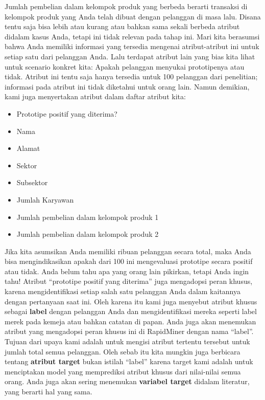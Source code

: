 \par Jumlah pembelian dalam kelompok produk yang berbeda berarti transaksi di kelompok produk yang Anda telah dibuat dengan pelanggan di masa lalu. Disana tentu saja bisa lebih atau kurang atau bahkan sama sekali berbeda atribut didalam kasus Anda, tetapi ini tidak relevan pada tahap ini. Mari kita berasumsi bahwa Anda memiliki informasi yang tersedia mengenai atribut-atribut ini untuk setiap satu dari pelanggan Anda. Lalu terdapat atribut lain yang bias kita lihat untuk scenario konkret kita: Apakah pelanggan menyukai prototipenya atau tidak. Atribut ini tentu saja hanya tersedia untuk 100 pelanggan dari penelitian; informasi pada atribut ini tidak diketahui untuk orang lain. Namun demikian, kami juga menyertakan atribut dalam daftar atribut kita:

\begin{itemize}
    \item 	Prototipe positif yang diterima?
 \item	Nama 
 \item	Alamat 
 \item	Sektor 
 \item	Subsektor 
 \item	Jumlah Karyawan 
 \item	Jumlah pembelian dalam kelompok produk 1 
 \item	Jumlah pembelian dalam kelompok produk 2

\end{itemize}

\par Jika kita asumsikan Anda memiliki ribuan pelanggan secara total, maka Anda bisa mengindikasikan apakah dari 100 ini mengevaluasi prototipe secara positif atau tidak. Anda belum tahu apa yang orang lain pikirkan, tetapi Anda ingin tahu! Atribut “prototipe positif yang diterima” juga mengadopsi peran khusus, karena mengidentifikasi setiap salah satu pelanggan Anda dalam kaitannya dengan pertanyaan saat ini. Oleh karena itu kami juga menyebut atribut khusus sebagai \textbf{label} dengan pelanggan Anda dan mengidentifikasi mereka seperti label merek pada kemeja atau bahkan catatan di papan. Anda juga akan menemukan atribut yang mengadopsi peran khusus ini di RapidMiner dengan nama “label”. Tujuan dari upaya kami adalah untuk mengisi atribut tertentu tersebut untuk jumlah total semua pelanggan. Oleh sebab itu kita mungkin juga berbicara tentang \textbf{atribut target }bukan istilah “label” karena target kami adalah untuk menciptakan model yang memprediksi atribut khusus dari nilai-nilai semua orang. Anda juga akan sering menemukan\textbf{ variabel target} didalam literatur, yang berarti hal yang sama.

